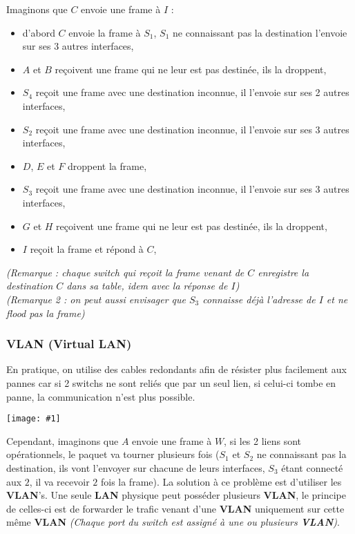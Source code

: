 \documentclass{article}
\newcommand{\imgR}[2]{\begin{center}\texttt{[image: \#1]}\end{center}}
\begin{document}
Imaginons que $C$ envoie une frame à $I$ :
\begin{itemize}
\item d'abord $C$ envoie la frame à $S_1$, $S_1$ ne connaissant pas la destination l'envoie sur ses 3 autres 
interfaces,
\item $A$ et $B$ reçoivent une frame qui ne leur est pas destinée, ils la droppent,
\item $S_4$ reçoit une frame avec une destination inconnue, il l'envoie sur ses 2 autres interfaces,
\item $S_2$ reçoit une frame avec une destination inconnue, il l'envoie sur ses 3 autres interfaces,
\item $D$, $E$ et $F$ droppent la frame,
\item $S_3$ reçoit une frame avec une destination inconnue, il l'envoie sur ses 3 autres interfaces,
\item $G$ et $H$ reçoivent une frame qui ne leur est pas destinée, ils la droppent,
\item $I$ reçoit la frame et répond à $C$,
\end{itemize}
\textit{(Remarque : chaque switch qui reçoit la frame venant de $C$ enregistre la destination $C$ dans sa table, 
idem avec la réponse de $I$)}\\
\textit{(Remarque 2 : on peut aussi envisager que $S_3$ connaisse déjà l'adresse de $I$ et ne flood pas la 
frame)}

\subsubsection{VLAN (Virtual LAN)}

En pratique, on utilise des cables redondants afin de résister plus facilement aux pannes car si 2 switchs ne 
sont reliés que par un seul lien, si celui-ci tombe en panne, la communication n'est plus possible.

\imgR{CN_126.png}{250}

Cependant, imaginons que $A$ envoie une frame à $W$, si les 2 liens sont opérationnels, le paquet va tourner 
plusieurs fois ($S_1$ et $S_2$ ne connaissant pas la destination, ils vont l'envoyer sur chacune de leurs 
interfaces, $S_3$ étant connecté aux $2$, il va recevoir $2$ fois la frame). La solution à ce problème est 
d'utiliser les \textbf{VLAN}'s. Une seule \textbf{LAN} physique peut posséder plusieurs \textbf{VLAN}, le 
principe de celles-ci est de forwarder le trafic venant d'une \textbf{VLAN} uniquement sur cette même 
\textbf{VLAN} \textit{(Chaque port du switch est assigné à une ou plusieurs \textbf{VLAN})}.
\end{document}
